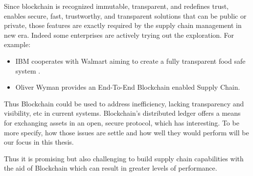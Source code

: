 Since blockchain is recognized immutable, transparent, and redefines trust, enables secure, fast, trustworthy, and transparent solutions that can be public or private, those features are exactly required by the supply chain management in new era. 
Indeed some enterprises are actively trying out the exploration. For example:

\begin{itemize}
	\item IBM cooperates with Walmart aiming to create a fully transparent food safe system \cite{walmart}.
	\item Oliver Wyman provides an End-To-End Blockchain enabled Supply Chain.
\end{itemize} 


Thus Blockchain could be used to address inefficiency, lacking transparency and visibility, etc in current systems. Blockchain’s
distributed ledger offers a means for exchanging assets in an open, secure protocol, which has interesting. To be more specify, how those issues are settle and how well they would perform will be our focus in this thesis.


Thus it is promising but also challenging to build supply chain capabilities with the aid of Blockchain which can result in greater levels of performance. 


